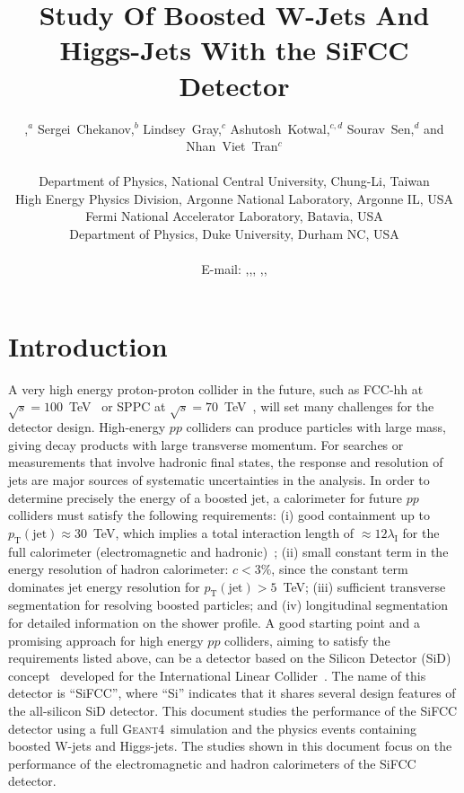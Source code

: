 \documentclass{PoS}
\title{Study Of Boosted W-Jets And Higgs-Jets With the SiFCC Detector}
\author{\speaker{Shin-Shan~Yu},$^{a}$ Sergei~Chekanov,$^{b}$ Lindsey~Gray,$^{c}$ Ashutosh~Kotwal,$^{c,d}$ Sourav~Sen,$^{d}$ and Nhan~Viet~Tran$^{c}$\\ \\
        \llap{$^a$}Department of Physics, National Central University, Chung-Li, Taiwan\\
        \llap{$^b$}High Energy Physics Division, Argonne National Laboratory, Argonne IL, USA\\
        \llap{$^c$}Fermi National Accelerator Laboratory, Batavia, USA\\
        \llap{$^d$}Department of Physics, Duke University, Durham NC, USA\\\\
        E-mail: \email{syu@cern.ch},\email{chekanov@anl.gov},\email{lagray@fnal.gov},
        \email{kotwal@phy.duke.edu},\email{ss567@phy.duke.edu},\email{ntran@fnal.gov}}
\newcommand{\ptj}{\ensuremath{p_{\mathrm{T}}(\mathrm{jet})}}
\newcommand{\GEANTfour} {{\textsc{Geant4}}}
\begin{document}
\section{Introduction}
A very high energy proton-proton collider in the future, such as FCC-hh 
at $\sqrt{s}=100$~TeV~\cite{FCC-hh} or 
SPPC at $\sqrt{s}=70$~TeV~\cite{SPPC-one,SPPC-three}, 
will set many challenges for the detector design. High-energy $pp$ colliders 
can produce particles with large mass, giving decay products with large 
transverse momentum. For searches or measurements that involve hadronic 
final states, the response and resolution of jets are major sources of 
systematic uncertainties in the analysis. 
In order to determine precisely the energy of a 
boosted jet, a calorimeter for future $pp$ colliders must satisfy the 
following requirements: (i)
 good containment up to $\ptj\approx 30$~TeV, which implies a total 
 interaction length of $\approx 12 \lambda_\mathrm{I}$ for the full 
 calorimeter (electromagnetic and hadronic)~\cite{bitch};
 (ii) small constant term in the energy resolution of hadron calorimeter: 
$c < 3\%$, since the constant term dominates jet energy resolution for 
$\ptj>5$~TeV;
 (iii) sufficient transverse segmentation for resolving boosted particles;
 and (iv) longitudinal segmentation for detailed information on the shower 
profile.
%
A good starting point and a promising approach for high energy $pp$ colliders, 
aiming to satisfy the requirements listed above, 
can be a detector based on the Silicon Detector (SiD) concept~\cite{sid} 
developed for the International Linear Collider~\cite{ILCone,ILCtwo}. The 
name of this detector is ``SiFCC'', where ``Si'' indicates that it 
shares several design features of the all-silicon SiD detector. 
%
This document studies the performance of the SiFCC detector using 
a full \GEANTfour\ simulation and the physics events containing 
boosted W-jets and Higgs-jets. The studies shown in this document 
focus on the performance of the electromagnetic and hadron calorimeters
 of the SiFCC detector.
\end{document}
